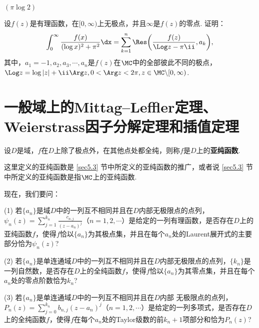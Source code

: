 \begin{xiti}
\begin{enuma}
\begin{figure}[!ht]
    \caption{\label{fig5.16}}
  \end{figure}
  \item  {}
  $(\pi\log2)$
\end{enuma}
  \item 设$f(z)$是有理函数，在$[0,\infty)$上无极点，并且$\infty$是$f(z)$的零点. 证明：
  \[\int_0^\infty\frac{f(x)}{(\log x)^2+\pi^2}\dx
  =\sum_{k=1}^n\Res\bigg(\frac{f(z)}{\Log z-\pi\ii},a_k\bigg),\]
其中，$a_1=-1,a_2,a_3,\cdots,a_n$是$f(z)$在$\MC$中的全部彼此不同的极点，$\Log z=\log|z|+\ii\Arg z,0<\Arg z<2\pi,z\in\MC\backslash[0,\infty)$.
\end{xiti}

\section{一般域上的Mittag--Leffler定理、Weierstrass因子分解定理和插值定理\label{sec5.6}}
\begin{definition}\label{def5.6.1}
设$D$是域，$f$在$D$上除了极点外，在其他点处都全纯，则称$f$是$D$上的\textbf{亚纯函数}.
\end{definition}

这里定义的亚纯函数是 \ref{sec5.3} 节中所定义的亚纯函数的推广，或者说 \ref{sec5.3} 节中所定义的亚纯函数是指$\MC$上的亚纯函数.

现在，我们要问：

(1) \hypertarget{5.6.1}{} 若$\{a_n\}$是域$D$中的一列互不相同并且在$D$内部无极限点的点列，$\psi_n(z)=\sum_{j=1}^{k_n}\frac{c_{n,j}}{(z-a_n)^j}$（$n=1,2,\cdots$）是给定的一列有理函数，是否存在$D$上的亚纯函数$f$，使得$f$恰以$\{a_n\}$为其极点集，并且在每个$a_n$处的Laurent展开式的主要部分恰为$\psi_n(z)$?

(2) \hypertarget{5.6.2}{} 若$\{a_n\}$是单连通域$D$中的一列互不相同并且在$D$内部无极限点的点列，$\{k_n\}$是一列自然数，是否存在$D$上的全纯函数$f$，使得$f$恰以$\{a_n\}$为其零点集，并且在每个$a_n$处的零点阶数恰为$k_n$?

(3) \hypertarget{5.6.3}{} 若$\{a_n\}$是单连通域$D$中的一列互不相同并且在$D$内部
无极限点的点列，$P_n(z)=\sum_{j=0}^{k_n}b_{n,j}(z-a_n)^j$（$n=1,2,\cdots$）是给定的一列多项式，是否存在$D$上的全纯函数$f$，使得$f$在每个$a_n$处的Taylor级数的前$k_n+1$项部分和恰为$P_n(z)$?

